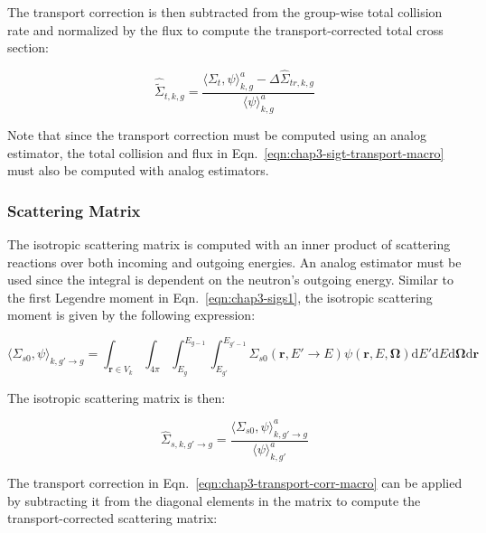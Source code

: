 \noindent The transport correction is then subtracted from the group-wise total collision rate and normalized by the flux to compute the transport-corrected total cross section:

\begin{equation}
\label{eqn:chap3-sigt-transport-macro}
\hat{\tilde{\Sigma}}_{t,k,g} = \frac{\langle \Sigma_{t}, \psi \rangle_{k,g}^{a} - \Delta\hat{\Sigma}_{tr,k,g}}{\langle \psi \rangle_{k,g}^{a}}
\end{equation}

\noindent Note that since the transport correction must be computed using an analog estimator, the total collision and flux in Eqn.~\ref{eqn:chap3-sigt-transport-macro} must also be computed with analog estimators.


\subsubsection{Scattering Matrix}
\label{subsubsec:chap3-tally-types-scatt-mat}

The isotropic scattering matrix is computed with an inner product of scattering reactions over both incoming and outgoing energies. An analog estimator must be used since the integral is dependent on the neutron's outgoing energy. Similar to the first Legendre moment in Eqn.~\ref{eqn:chap3-sigs1}, the isotropic scattering moment is given by the following expression:

\begin{equation}
\label{eqn:chap3-sigs0}
\langle \Sigma_{s0}, \psi \rangle_{k,g'\rightarrow g} = \int_{\mathbf{r} \in V_{k}} \int_{4\pi} \int_{E_{g}}^{E_{g-1}} \int_{E_{g'}}^{E_{g'-1}} \Sigma_{s0}(\mathbf{r},E'\rightarrow E)\psi(\mathbf{r},E,\mathbf{\Omega}) \mathrm{d}E'\mathrm{d}E\mathrm{d}\mathbf{\Omega}\mathrm{d}\mathbf{r}
\end{equation}

\noindent The isotropic scattering matrix is then:

\begin{equation}
\label{eqn:chap3-scatter-macro}
\hat{\Sigma}_{s,k,g'\rightarrow g} = \frac{\langle \Sigma_{s0}, \psi \rangle_{k,g'\rightarrow g}^{a}}{\langle \psi \rangle_{k,g'}^{a}}
\end{equation}

\noindent The transport correction in Eqn.~\ref{eqn:chap3-transport-corr-macro} can be applied by subtracting it from the diagonal elements in the matrix to compute the transport-corrected scattering matrix:


